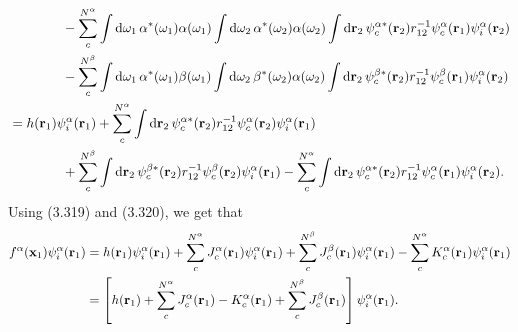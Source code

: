 \documentclass[a4paper]{book}
\newcounter{solution}[chapter]
\newcommand*{\dif}{\mathop{}\!\mathrm{d}}
\newcommand{\bfr}{{\bf r}}
\newcommand{\bfx}{{\bf x}}
\begin{document}
\begin{solution}
\begin{align*}
		&\hspace{4em} - \sum_c^{N^\alpha} \int \dif \omega_1 \, \alpha^*( \omega_1 ) \alpha( \omega_1 ) \int \dif \omega_2 \,\alpha^*( \omega_2 ) \alpha( \omega_2 ) \int \dif \bfr_2 \, \psi^{\alpha*}_c( \bfr_2 ) r^{-1}_{12} \psi^\alpha_c ( \bfr_1 )  \psi^\alpha_i( \bfr_2 )  \\
		&\hspace{4em} - \sum_c^{N^\beta} \int \dif \omega_1 \, \alpha^*( \omega_1 ) \beta( \omega_1 ) \int \dif \omega_2 \, \beta^*( \omega_2 ) \alpha( \omega_2 ) \int \dif \bfr_2 \, \psi^{\beta*}_c( \bfr_2 )  r^{-1}_{12} \psi^\beta_c ( \bfr_1 ) \psi^\alpha_i( \bfr_2 ) \\
		&= h( \bfr_1 ) \psi^\alpha_i( \bfr_1) + \sum_c^{N^\alpha} \int \dif \bfr_2 \, \psi^{\alpha*}_c( \bfr_2 )  r^{-1}_{12} \psi^{\alpha}_c ( \bfr_2 ) \psi^\alpha_i( \bfr_1 ) \\
		&\hspace{4em} + \sum_c^{N^\beta} \int \dif \bfr_2  \, \psi^{\beta*}_c( \bfr_2 )  r^{-1}_{12} \psi^{\beta}_c ( \bfr_2 )  \psi^\alpha_i( \bfr_1 ) - \sum_c^{N^\alpha} \int \dif \bfr_2 \, \psi^{\alpha*}_c( \bfr_2 )  r^{-1}_{12} \psi^\alpha_c ( \bfr_1 )  \psi^\alpha_i( \bfr_2 ) .
	\end{align*}
	Using (3.319) and (3.320), we get that
	\begin{align*}
		f^\alpha( \bfx_1 ) \psi^\alpha_i( \bfr_1 ) &= h( \bfr_1 ) \psi^\alpha_i( \bfr_1 ) + \sum_c^{N^\alpha} J^\alpha_c( \bfr_1 ) \psi^\alpha_i( \bfr_1 )  + \sum_c^{N^\beta} J^\beta_c( \bfr_1 ) \psi^\alpha_i( \bfr_1 ) - \sum_c^{N^\alpha} K^\alpha_c( \bfr_1 ) \psi^\alpha_i( \bfr_1 ) \\
		&= \left[ h( \bfr_1 ) + \sum_c^{N^\alpha} J^\alpha_c( \bfr_1 ) - K^\alpha_c( \bfr_1 ) + \sum_c^{N^\beta} J^\beta_c( \bfr_1 ) \right] \psi^\alpha_i( \bfr_1 ) .
	\end{align*}
	

\end{solution}
\end{document}
